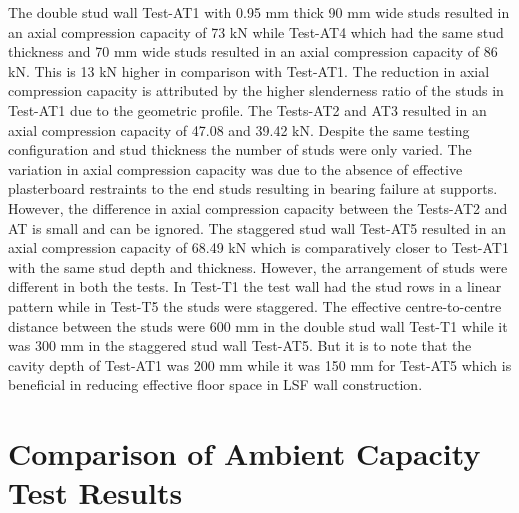The double stud wall Test-AT1 with 0.95 mm thick 90 mm wide studs resulted in an axial compression capacity of 73 kN while Test-AT4 which had the same stud thickness and 70 mm wide studs resulted in an axial compression capacity of 86 kN. This is 13 kN higher in comparison with Test-AT1. The reduction in axial compression capacity is attributed by the higher slenderness ratio of the studs in Test-AT1 due to the geometric profile. The Tests-AT2 and AT3 resulted in an axial compression capacity of 47.08 and 39.42 kN. Despite the same testing configuration and stud thickness the number of studs were only varied. The variation in axial compression capacity was due to the absence of effective plasterboard restraints to the end studs resulting in bearing failure at supports. However, the difference in axial compression capacity between the Tests-AT2 and AT is small and can be ignored. The staggered stud wall Test-AT5 resulted in an axial compression capacity of 68.49 kN which is comparatively closer to Test-AT1 with the same stud depth and thickness. However, the arrangement of studs were different in both the tests. In Test-T1 the test wall had the stud rows in a linear pattern while in Test-T5 the studs were staggered. The effective centre-to-centre distance between the studs were 600 mm in the double stud wall Test-T1 while it was 300 mm in the staggered stud wall Test-AT5. But it is to note that the cavity depth of Test-AT1 was 200 mm while it was 150 mm for Test-AT5 which is beneficial in reducing effective floor space in LSF wall construction.

\section{Comparison of Ambient Capacity Test Results}


